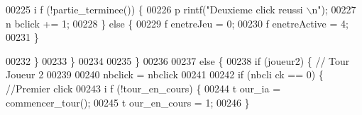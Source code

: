 \begin{DoxyCode}
00225                                                                                 \textcolor{keywordflow}{i
      f} (!partie\_terminee()) \{
00226                                                                                         p
      rintf(\textcolor{stringliteral}{"Deuxieme click reussi \(\backslash\)n"});
00227                                                                                         n
      bclick += 1;
00228                                                                                 \}
       \textcolor{keywordflow}{else} \{
00229                                                                                         f
      enetreJeu = 0;
00230                                                                                         f
      enetreActive = 4;
00231                                                                                 \}
      
00232                                                                         \}
00233                                                                 \}
00234 
00235                                                         \}
00236 
00237                                                         \textcolor{keywordflow}{else} \{
00238                                                                 \textcolor{keywordflow}{if} (joueur2) \{ \textcolor{comment}{//
       Tour Joueur 2}
00239 
00240                                                                         nbclick =
       nbclick %
00241 
00242                                                                         \textcolor{keywordflow}{if} (nbcli
      ck == 0) \{ \textcolor{comment}{//Premier click}
00243                                                                                 \textcolor{keywordflow}{i
      f} (!tour\_en\_cours) \{
00244                                                                                         t
      our\_ia = commencer\_tour();
00245                                                                                         t
      our\_en\_cours = 1;
00246                                                                                 \}
      

\end{DoxyCode}
